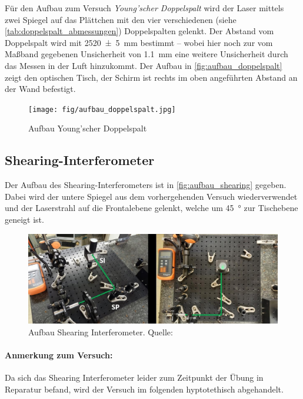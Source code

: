 \documentclass[ngerman]{scrartcl}
\begin{document}
Für den Aufbau zum Versuch \textit{Young'scher Doppelspalt} wird der Laser mittels zwei Spiegel auf das Plättchen mit den vier verschiedenen (siehe \autoref{tab:doppelspalt_abmessungen}) Doppelspalten gelenkt. Der Abstand vom Doppelspalt wird mit \SI{2520(5)}{\milli\meter} bestimmt -- wobei hier noch zur vom Maßband gegebenen Unsicherheit von \SI{1.1}{\milli\meter} eine weitere Unsicherheit durch das Messen in der Luft hinzukommt. Der Aufbau in \autoref{fig:aufbau_doppelspalt} zeigt den optischen Tisch, der Schirm ist rechts im oben angeführten Abstand an der Wand befestigt.
\begin{figure}[H]
    \centering
    \begin{samepage}
        \texttt{[image: fig/aufbau\_doppelspalt.jpg]}
        \caption{Aufbau Young'scher Doppelspalt}
        \label{fig:aufbau_doppelspalt}
    \end{samepage}
\end{figure}


\subsection{Shearing-Interferometer}
\label{sec:aufbau_shearing}

Der Aufbau des Shearing-Interferometers ist in \autoref{fig:aufbau_shearing} gegeben. Dabei wird der untere Spiegel aus dem vorhergehenden Versuch wiederverwendet und der Laserstrahl auf die Frontalebene gelenkt, welche um \SI{45}{\degree} zur Tischebene geneigt ist.
%
\begin{figure}[H]
    \centering
    \begin{samepage}
        \includegraphics[width=0.9\linewidth]{fig/shearing.jpg}
        \caption[Aufbau Shearing Interferometer]{Aufbau Shearing Interferometer. Quelle: \cite{ref:angabe}}
        \label{fig:aufbau_shearing}
    \end{samepage}
\end{figure}
%
\paragraph{Anmerkung zum Versuch:} Da sich das Shearing Interferometer leider zum Zeitpunkt der Übung in Reparatur befand, wird der Versuch im folgenden hyptotethisch abgehandelt.
\end{document}
